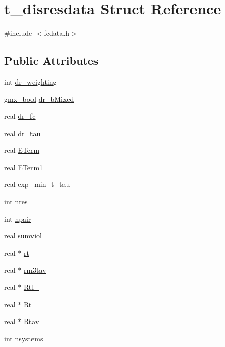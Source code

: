 \hypertarget{structt__disresdata}{\section{t\-\_\-disresdata \-Struct \-Reference}
\label{structt__disresdata}
}


{\ttfamily \#include $<$fcdata.\-h$>$}

\subsection*{\-Public \-Attributes}
\begin{DoxyCompactItemize}
\item 
int \hyperlink{structt__disresdata_a3f528cf388665a79fcffb6d2eade4792}{dr\-\_\-weighting}
\item 
\hyperlink{include_2types_2simple_8h_a8fddad319f226e856400d190198d5151}{gmx\-\_\-bool} \hyperlink{structt__disresdata_a31b4b7aa4ff77c5e853d08d7d5b3a17e}{dr\-\_\-b\-Mixed}
\item 
real \hyperlink{structt__disresdata_ae03b13310b824a7f5045230c6f44335f}{dr\-\_\-fc}
\item 
real \hyperlink{structt__disresdata_a3be69e951894d82d404a2d924d5a914a}{dr\-\_\-tau}
\item 
real \hyperlink{structt__disresdata_aa3eb2a05de3e28d95906ddc95531f4d4}{\-E\-Term}
\item 
real \hyperlink{structt__disresdata_ae2494fedea7b46dbe6cd7d77e70bb32f}{\-E\-Term1}
\item 
real \hyperlink{structt__disresdata_ad18cac68a0580f93ef1fa6cff1750a56}{exp\-\_\-min\-\_\-t\-\_\-tau}
\item 
int \hyperlink{structt__disresdata_a6ae11a0ef1eab3fc15db6c11c10c9d76}{nres}
\item 
int \hyperlink{structt__disresdata_a6887ba82e1246c62db359be12e2ad0db}{npair}
\item 
real \hyperlink{structt__disresdata_a336616ace3d10e3c3052a22aaac8a8be}{sumviol}
\item 
real $\ast$ \hyperlink{structt__disresdata_a5be4b2bc44742d683a38103982ae7ab8}{rt}
\item 
real $\ast$ \hyperlink{structt__disresdata_a90df220a41016d5a787894e67b9e0d08}{rm3tav}
\item 
real $\ast$ \hyperlink{structt__disresdata_a69749c750c867e6fa1c7346fb0a86339}{\-Rtl\-\_}
\item 
real $\ast$ \hyperlink{structt__disresdata_a422dfc84a659e7dc906ceba4813fd29a}{\-Rt\-\_}
\item 
real $\ast$ \hyperlink{structt__disresdata_ac4521b81a9e516993b54620e1d0899e3}{\-Rtav\-\_}
\item 
int \hyperlink{structt__disresdata_a1c63fb05fd13487989e85e2335b106e1}{nsystems}
\end{DoxyCompactItemize}


